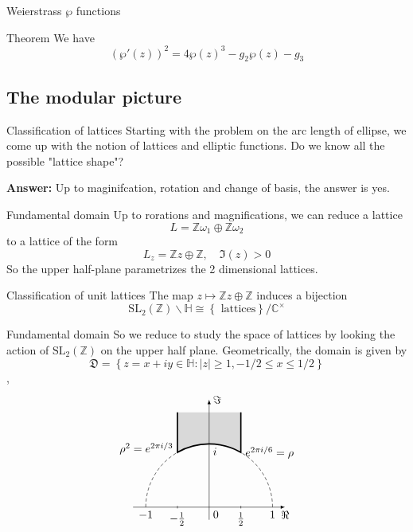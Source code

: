 \documentclass[pdf]{beamer}
\begin{document}
\begin{frame}{Weierstrass $\wp$ functions}
    \begin{block}{Theorem }
        We have
        \[(\wp'(z))^2 = 4\wp(z)^3-g_2\wp(z)-g_3\]
    \end{block}
\end{frame}
\subsection{The modular picture}
\begin{frame}{Classification of lattices}
    Starting with the problem on the arc length of ellipse, we come up with the notion of lattices and elliptic functions. Do we know all the possible "lattice shape"?\vspace{3em}

    \pause
    \textbf{Answer:} Up to maginifcation, rotation and change of basis, the answer is yes.
\end{frame}
\begin{frame}{Fundamental domain}
    Up to rorations and magnifications, we can reduce a lattice
    \[L = \mathbb{Z}\omega_1 \oplus \mathbb{Z}\omega_2\]
    to a lattice of the form
    \[L_z = \mathbb{Z}z\oplus\mathbb{Z}, \quad \Im(z)>0\]
    So the upper half-plane parametrizes the 2 dimensional lattices.
    \begin{block}{Classification of unit lattices}
        The map $z \mapsto \mathbb{Z}z\oplus\mathbb{Z}$ induces a bijection
        \[\text{SL}_2(\mathbb{Z}) \backslash\mathbb{H} \cong \left\lbrace \text{ lattices}\right\rbrace/\mathbb{C^\times}\]
    \end{block}

\end{frame}
\begin{frame}{Fundamental domain}
    So we reduce to study the space of lattices by looking the action of $\text{SL}_2(\mathbb{Z})$ on the upper half plane. Geometrically, the domain is given by
    \[\mathfrak{D} = \left\lbrace z=x+iy \in \mathbb{H}: |z| \ge 1,-1/2 \le x \le 1/2 \right\rbrace \],
    \pause
    \[
        \begin{tikzpicture}[scale=2]
            \draw[densely dashed] (1,0) arc (0:60:1) (-1,0) arc (180:120:1);
            \draw[very thick, fill=gray!30] (.5,1.5) --node[right, pos=1]{$e^{2\pi i/6}=\rho$} (60:1) arc (60:120:1)
            --node[left, pos=.1]{$\rho^2=e^{2\pi i/3}$} (-.5,1.5);
            \draw[-latex] (-1.2,0) -- (1.2,0)node[below]{$\Re$};
            \draw[-latex] (0,-.2) -- (0,1.7)node[right]{$\Im$};
            \path(-1,0) --node[below, pos=0]{$-1$}node[below right, pos=.5]{0}node[below, pos=1]{1} (1,0)
            (0,1)node[below right]{$i$};
            \draw(-.5,.02)--(-.5,-.02)node[below]{$-\frac{1}{2}$}(.5,.02)--(.5,-.02)node[below]{$\frac{1}{2}$};
        \end{tikzpicture}\]
\end{frame}
\end{document}
